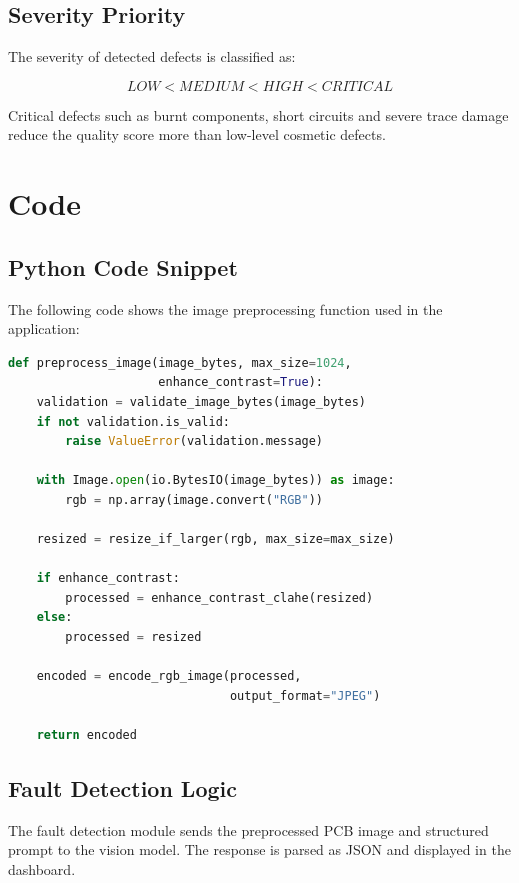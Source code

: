 \documentclass[12pt,a4paper]{report}
\begin{document}
\section{Severity Priority}

The severity of detected defects is classified as:

\[
LOW < MEDIUM < HIGH < CRITICAL
\]

Critical defects such as burnt components, short circuits and severe trace damage reduce the quality score more than low-level cosmetic defects.


\chapter{Code}

\section{Python Code Snippet}

The following code shows the image preprocessing function used in the application:

\begin{lstlisting}[language=Python]
def preprocess_image(image_bytes, max_size=1024,
                     enhance_contrast=True):
    validation = validate_image_bytes(image_bytes)
    if not validation.is_valid:
        raise ValueError(validation.message)

    with Image.open(io.BytesIO(image_bytes)) as image:
        rgb = np.array(image.convert("RGB"))

    resized = resize_if_larger(rgb, max_size=max_size)

    if enhance_contrast:
        processed = enhance_contrast_clahe(resized)
    else:
        processed = resized

    encoded = encode_rgb_image(processed,
                               output_format="JPEG")

    return encoded
\end{lstlisting}

\section{Fault Detection Logic}

The fault detection module sends the preprocessed PCB image and structured prompt to the vision model. The response is parsed as JSON and displayed in the dashboard.
\end{document}
